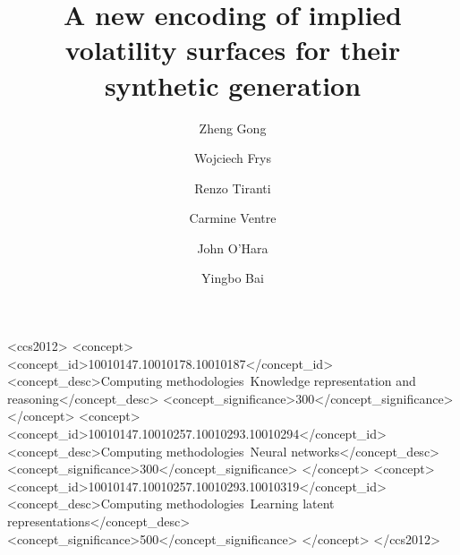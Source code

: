 \documentclass[format=sigconf]{acmart}
\begin{document}
\title[]{A new encoding of implied volatility surfaces for their synthetic generation}

\author{Zheng Gong}

\author{Wojciech Frys}

\author{Renzo Tiranti}

\author{Carmine Ventre}

\author{John O'Hara}

\author{Yingbo Bai}

\begin{CCSXML}
<ccs2012>
   <concept>
       <concept_id>10010147.10010178.10010187</concept_id>
       <concept_desc>Computing methodologies~Knowledge representation and reasoning</concept_desc>
       <concept_significance>300</concept_significance>
       </concept>
   <concept>
       <concept_id>10010147.10010257.10010293.10010294</concept_id>
       <concept_desc>Computing methodologies~Neural networks</concept_desc>
       <concept_significance>300</concept_significance>
       </concept>
   <concept>
       <concept_id>10010147.10010257.10010293.10010319</concept_id>
       <concept_desc>Computing methodologies~Learning latent representations</concept_desc>
       <concept_significance>500</concept_significance>
       </concept>
 </ccs2012>
\end{CCSXML}

\end{document}
